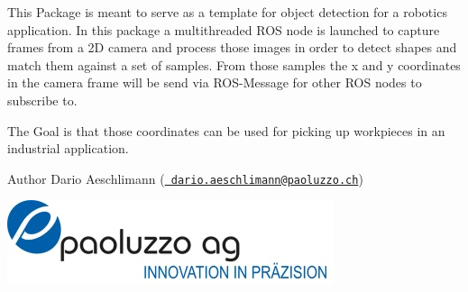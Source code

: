 This Package is meant to serve as a template for object detection for a robotics application. In this package a multithreaded R\+OS node is launched to capture frames from a 2D camera and process those images in order to detect shapes and match them against a set of samples. From those samples the x and y coordinates in the camera frame will be send via R\+O\+S-\/\+Message for other R\+OS nodes to subscribe to.

The Goal is that those coordinates can be used for picking up workpieces in an industrial application.

\begin{DoxyAuthor}{Author}
Dario Aeschlimann (\href{mailto:dario.aeschlimann@paoluzzo.ch}{\texttt{ dario.\+aeschlimann@paoluzzo.\+ch}})
\end{DoxyAuthor}
 
\begin{DoxyImage}
\includegraphics[width=\textwidth,height=\textheight/2,keepaspectratio=true]{Pao_Logo.jpg}
\end{DoxyImage}
   
